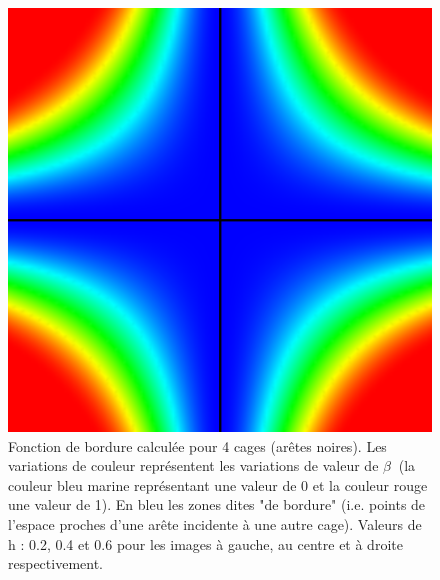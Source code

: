 \begin{figure}[h]
\begin{center}
    \includegraphics[scale=0.35]{starCage-0-6}
    \caption{Fonction de bordure calculée pour 4 cages (arêtes
      noires). Les variations de couleur représentent les variations
      de valeur de $\beta~$ (la couleur bleu marine représentant une
      valeur de 0 et la couleur rouge une valeur de 1). En bleu les
      zones dites "de bordure" (i.e. points de l'espace proches d'une
      arête incidente à une autre cage). Valeurs de h : 0.2, 0.4 et
      0.6 pour les images à gauche, au centre et à droite
      respectivement.}
    \label{MELpar}
  \end{center}
\end{figure}

